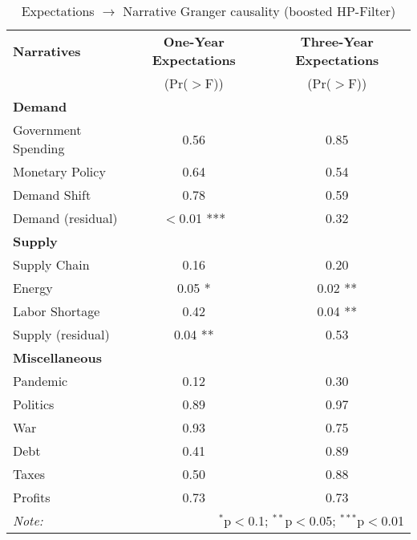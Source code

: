 \begin{table}[ht]
\centering
\caption{Expectations $\rightarrow$ Narrative Granger causality (boosted HP-Filter)}\label{tab:granger}

\begin{tabular}{lcc}
\toprule
\textbf{Narratives} & \textbf{One-Year Expectations} & \textbf{Three-Year Expectations} \\
& (Pr($>$F)) & (Pr($>$F)) \\
\midrule
\multicolumn{3}{l}{\textbf{Demand}} \\
\midrule
Government Spending & 0.56 & 0.85 \\
Monetary Policy & 0.64 & 0.54 \\
Demand Shift & 0.78 & 0.59 \\
Demand (residual) & $<$0.01 *** & 0.32 \\
\midrule
\multicolumn{3}{l}{\textbf{Supply}} \\
\midrule
Supply Chain & 0.16 & 0.20 \\
Energy & 0.05 * & 0.02 ** \\
Labor Shortage & 0.42 & 0.04 ** \\
Supply (residual) & 0.04 ** & 0.53 \\
\midrule
\multicolumn{3}{l}{\textbf{Miscellaneous}} \\
\midrule
Pandemic & 0.12 & 0.30 \\
Politics & 0.89 & 0.97 \\
War & 0.93 & 0.75 \\
Debt & 0.41 & 0.89 \\
Taxes & 0.50 & 0.88 \\
Profits & 0.73 & 0.73 \\
\midrule
\bottomrule
\textit{Note:}  & \multicolumn{2}{r}{$^{*}$p$<$0.1; $^{**}$p$<$0.05; $^{***}$p$<$0.01} \\
\bottomrule
\end{tabular}
\end{table}
